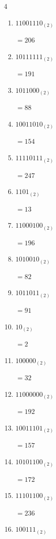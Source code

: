\begin{multicols}{4}
\begin{enumerate}
        $=129$

  \item $11001110_{(2)}$

        $=206$

  \item $10111111_{(2)}$

        $=191$

\columnbreak %

  \item $1011000_{(2)}$

        $=88$

  \item $10011010_{(2)}$

        $=154$

  \item $11110111_{(2)}$

        $=247$

  \item $1101_{(2)}$

        $=13$

  \item $11000100_{(2)}$

        $=196$

  \item $1010010_{(2)}$

        $=82$

  \item $1011011_{(2)}$

        $=91$

  \item $10_{(2)}$

        $=2$

  \item $100000_{(2)}$

        $=32$

  \item $11000000_{(2)}$

        $=192$

  \item $10011101_{(2)}$

        $=157$

  \item $10101100_{(2)}$

        $=172$

  \item $11101100_{(2)}$

        $=236$

  \item $100111_{(2)}$


\end{enumerate}
\end{multicols}
